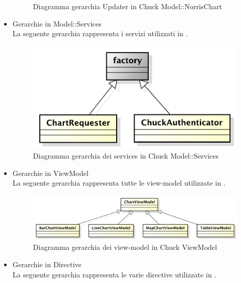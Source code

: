 \begin{itemize}
\begin{figure}[H]
                        \caption{Diagramma gerarchia Updater in Chuck Model::NorrisChart }
                    \end{figure}
                \item Gerarchie in Model::Services \\
                    La seguente gerarchia rappresenta i servizi utilizzati in .
                    \begin{figure}[H]
                        \centering
                        \includegraphics[width=1\textwidth]{DefinizioneDiProdotto/Pics/Gerarchie/ChuckService.pdf}
                        \caption{Diagramma gerarchia dei services in Chuck Model::Services}
                    \end{figure}
                \item Gerarchie in ViewModel \\
                    La seguente gerarchia rappresenta tutte le view-model utilizzate in .
                    \begin{figure}[H]
                        \centering
                        \includegraphics[width=1\textwidth]{DefinizioneDiProdotto/Pics/Gerarchie/ChuckViewModel.pdf}
                        \caption{Diagramma gerarchia dei view-model in Chuck ViewModel}
                    \end{figure}
                \item Gerarchie in Directive \\
                    La seguente gerarchia rappresenta le varie directive utilizzate in .

\end{itemize}
